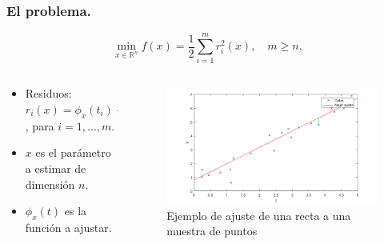 \documentclass{beamer}
\begin{document}
\begin{frame}
    \frametitle{El problema.}
    \begin{equation*}
        \min_{x\in \mathbb{R}^{n}}f(x) = \frac{1}{2}\sum_{i=1}^{m}r_i^2(x), \quad m\geq n,
    \end{equation*}
    \pause
\begin{columns}
    \begin{column}{0.4\textwidth}
        \begin{itemize}[label=\textbullet]
            \item Residuos: $r_i(x) = \phi_x(t_i) - y_i$, para $i=1,\dots,m$. \pause
            \item $x$ es el parámetro a estimar de dimensión $n$. \pause 
            \item $\phi_x(t)$ es la función a ajustar. \pause 
        \end{itemize}
    \end{column}
    \begin{column}{0.6\textwidth}  %
        \begin{figure}[h]
            \centering
            \includegraphics[width=1\textwidth]{imgs/examplelsqlin.png}
            \caption{Ejemplo de ajuste de una recta a una muestra de puntos}
        \end{figure}
    \end{column}
\end{columns}
\end{frame}
\end{document}
